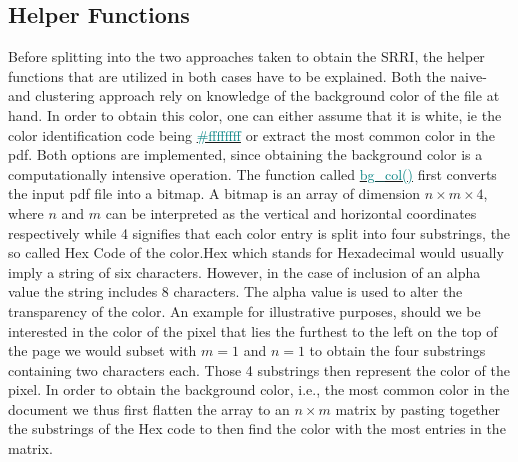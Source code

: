 \documentclass[aodsor,preprint]{imsart}
\numberwithin{equation}{section}
\theoremstyle{plain}
\begin{document}
\subsection{Helper Functions}
Before splitting into the two approaches taken to obtain the SRRI, the helper functions that are utilized in both cases have to be explained. Both the naive- and clustering approach rely on knowledge of the background color of the file at hand. In order to obtain this color, one can either assume that it is white, ie the color identification code being \href{https://www.color-hex.com/color/ffffff}{\textcolor{teal}{\#ffffffff}} or extract the most common color in the pdf. Both options are implemented, since obtaining the background color is a computationally intensive operation. The function called  \href{https://github.com/Base-R-Best-R/KID/blob/main/Code/Package/KIDs/R/background_col_id.R}{\textcolor{teal}{bg\_col()}} first converts the input pdf file into a bitmap. A bitmap is an array of dimension $n \times m \times 4$, where $n$ and $m$ can be interpreted as the vertical and horizontal coordinates respectively while 4 signifies that each color entry is split into four substrings, the so called Hex Code of the color.Hex which stands for Hexadecimal would usually imply a string of six characters. However, in the case of inclusion of an alpha value the string includes 8 characters. The alpha value is used to alter the transparency of the color. An example for illustrative purposes, should we be interested in the color of the pixel that lies the furthest to the left on the top of the page we would subset with $m = 1$ and $n = 1$ to obtain the four substrings containing two characters each. Those 4 substrings then represent the color of the pixel. In order to obtain the background color, i.e., the most common color in the document we thus first flatten the array to an $n\times m$ matrix by pasting together the substrings of the Hex code to then find the color with the most entries in the matrix.\\
\end{document}
